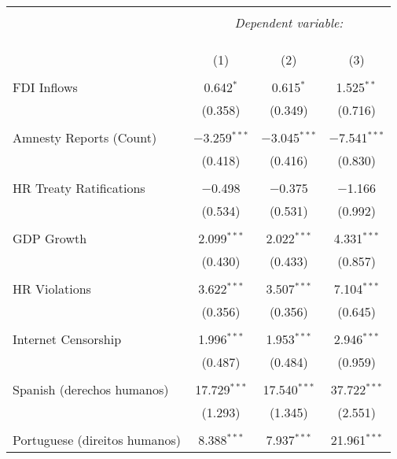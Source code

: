 
\begin{table}[!htbp] \centering 
  \caption{} 
  \label{} 
\begin{tabular}{@{\extracolsep{5pt}}lccc} 
\\[-1.8ex]\hline 
\hline \\[-1.8ex] 
 & \multicolumn{3}{c}{\textit{Dependent variable:}} \\ 
\cline{2-4} 
\\[-1.8ex] & \multicolumn{3}{c}{ } \\ 
\\[-1.8ex] & (1) & (2) & (3)\\ 
\hline \\[-1.8ex] 
 FDI Inflows & 0.642$^{*}$ & 0.615$^{*}$ & 1.525$^{**}$ \\ 
  & (0.358) & (0.349) & (0.716) \\ 
  & & & \\ 
 Amnesty Reports (Count) & $-$3.259$^{***}$ & $-$3.045$^{***}$ & $-$7.541$^{***}$ \\ 
  & (0.418) & (0.416) & (0.830) \\ 
  & & & \\ 
 HR Treaty Ratifications & $-$0.498 & $-$0.375 & $-$1.166 \\ 
  & (0.534) & (0.531) & (0.992) \\ 
  & & & \\ 
 GDP Growth & 2.099$^{***}$ & 2.022$^{***}$ & 4.331$^{***}$ \\ 
  & (0.430) & (0.433) & (0.857) \\ 
  & & & \\ 
 HR Violations & 3.622$^{***}$ & 3.507$^{***}$ & 7.104$^{***}$ \\ 
  & (0.356) & (0.356) & (0.645) \\ 
  & & & \\ 
 Internet Censorship & 1.996$^{***}$ & 1.953$^{***}$ & 2.946$^{***}$ \\ 
  & (0.487) & (0.484) & (0.959) \\ 
  & & & \\ 
 Spanish (derechos humanos) & 17.729$^{***}$ & 17.540$^{***}$ & 37.722$^{***}$ \\ 
  & (1.293) & (1.345) & (2.551) \\ 
  & & & \\ 
 Portuguese (direitos humanos) & 8.388$^{***}$ & 7.937$^{***}$ & 21.961$^{***}$ \\ 

\end{tabular}
\end{table}
